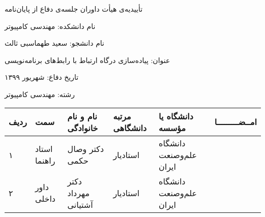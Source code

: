\newpage
\thispagestyle{empty}

\begin{center}
{\Large
    تأییدیه‌ی هیأت داوران جلسه‌ی دفاع از پایان‌نامه
}
\end{center}
\vspace{1cm}

نام دانشكده: مهندسی کامپیوتر

نام دانشجو: سعید طهماسبی ثالث

عنوان: پیاده‌سازی درگاه ارتباط با رابط‌های برنامه‌نویسی

تاریخ دفاع: شهریور ۱۳۹۹

رشته: مهندسی کامپیوتر \\[50pt]
\begin{center}
    \begin{tabular}{| p{8mm} | p{18mm} | p{} |p{14mm}|p{}|c|}
        \hline
        ردیف & سمت & نام و نام خانوادگی & مرتبه دانشگاهی & دانشگاه یا مؤسسه & امــضـــــــــا\\
        \hline
        ۱ & استاد راهنما & دکتر \newline وصال حکمی & استادیار & دانشگاه علم‌و‌صنعت ایران &    \\
        \hline
        ۲ & داور داخلی & دکتر \newline مهرداد آشتیانی & استادیار & دانشگاه علم‌و‌صنعت ایران   &     \\
        \hline


    \end{tabular}
\end{center}


\cleardoublepage 